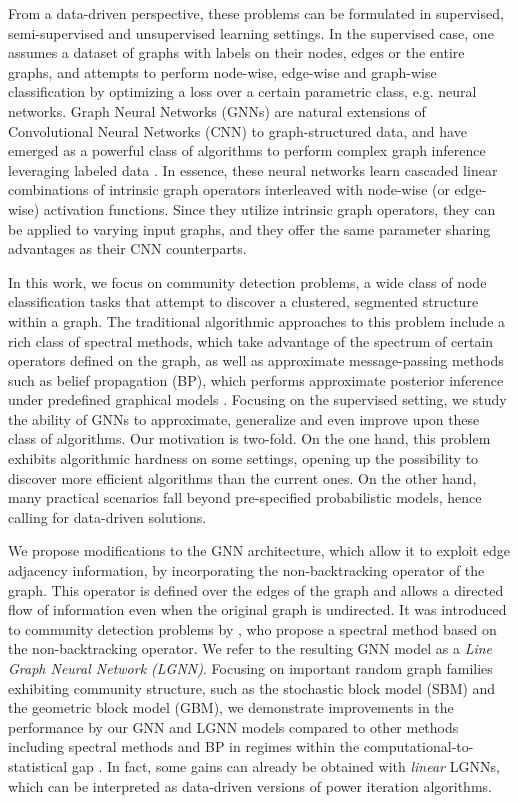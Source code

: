 \documentclass{article} \usepackage{iclr2019_conference,times}
\begin{document}
From a data-driven perspective, these problems can be formulated in supervised, semi-supervised and unsupervised learning settings. In the supervised case, one assumes a dataset of graphs with labels on their nodes, edges or the entire graphs, and attempts to perform node-wise, edge-wise and graph-wise classification by optimizing a loss over a certain parametric class, e.g. neural networks. Graph Neural Networks (GNNs)
are natural extensions of Convolutional Neural Networks (CNN) to graph-structured data, and have emerged as a powerful class of algorithms to perform complex graph inference leveraging labeled data \citep{gori2005new, bruna2013spectral, duvenaud2015convolutional, bronstein2016geometric, kipf2016semi, defferrard2016convolutional, hamilton2017inductive}. In essence, these neural networks learn cascaded linear combinations of intrinsic graph operators interleaved with node-wise (or edge-wise) activation functions. Since they utilize intrinsic graph operators, they can be applied to varying input graphs, and they offer the same parameter sharing advantages as their CNN counterparts.

In this work, we focus on community detection problems, a wide class of node classification tasks that attempt to discover a clustered, segmented structure within a graph. The traditional algorithmic approaches to this problem include a rich class of spectral methods, which take advantage of the spectrum of certain operators defined on the graph, as well as approximate message-passing methods such as belief propagation (BP), which performs approximate posterior inference under predefined graphical models \citep{decelle2011asymptotic}. Focusing on the supervised setting, we study the ability of GNNs to approximate, generalize and even improve upon these class of algorithms. Our motivation is two-fold. On the one hand, this problem exhibits algorithmic hardness on some settings, opening up the possibility to discover more efficient algorithms than the current ones. On the other hand, many practical scenarios fall beyond pre-specified probabilistic models, hence calling for data-driven solutions. 

We propose modifications to the GNN architecture, which allow it to exploit edge adjacency information, by incorporating the non-backtracking operator of the graph. This operator is defined over the edges of the graph and allows a directed flow of information even when the original graph is undirected. It was introduced to community detection problems by \cite{krzakala2013spectral}, who propose a spectral method based on the non-backtracking operator.  We refer to the resulting GNN model as a \emph{Line Graph Neural Network (LGNN)}.
Focusing on important random graph families exhibiting community structure, such as the stochastic block model (SBM) and the geometric block model (GBM), we demonstrate improvements in the performance by our GNN and LGNN models compared to other methods including spectral methods and BP in regimes within the computational-to-statistical gap \citep{abbe2017community}. In fact, some gains can already be obtained with \emph{linear} LGNNs, which can be interpreted as data-driven versions of power iteration algorithms.
\end{document}
